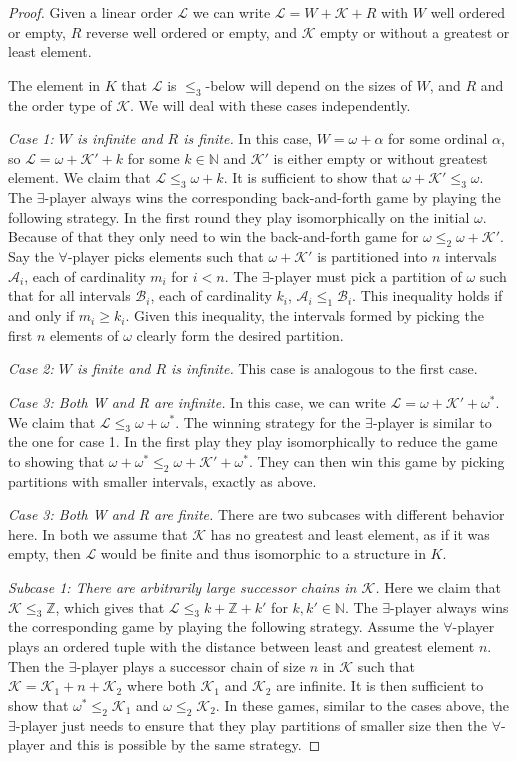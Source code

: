 \documentclass[10pt,a4paper]{amsart}
\providecommand{\A}{\mathcal{A}}
\providecommand{\L}{\mathcal{L}}
\providecommand{\B}{\mathcal{B}}
\newcommand{\Z}{\mathbb{Z}}
\newcommand{\K}{\mathcal{K}}
\renewcommand{\L}{\mathcal{L}}
\begin{document}
\begin{proof}
Given a linear order $\L$ we can write $\L=W+\K+R$ with $W$ well ordered or
empty, $R$ reverse well ordered or empty, and $\K$ empty or without a greatest or least element.

The element in $K$ that $\L$ is $\leq_3$-below will depend on the sizes
of $W$, and $R$ and the order type of $\K$. We will deal with these cases
independently.

\emph{Case 1: $W$ is infinite and $R$ is finite.}
In this case, $W=\omega+\alpha$ for some ordinal $\alpha$, so $\L=\omega+\K'+k$
for some $k\in \mathbb{N}$ and $\K'$ is either empty or without greatest element.
We claim that $\L\leq_3\omega+k$.
It is sufficient to show that $\omega+\K'\leq_3\omega$.
The $\exists$-player always wins the corresponding back-and-forth game by
playing the following strategy. In the first round they play isomorphically on
the initial $\omega$. Because of that they only need to win the back-and-forth game for $\omega\leq_2 \omega+\K'$. Say the $\forall$-player picks elements such that
$\omega+\K'$ is partitioned into $n$ intervals $\A_i$, each of cardinality $m_i$ for
$i<n$. The $\exists$-player must pick a partition of $\omega$ such that for all intervals $\B_i$, each of
cardinality $k_i$, $\A_i\leq_1 \B_i$. This inequality holds if and only if
$m_i\geq k_i$. Given this inequality, the intervals formed by picking the first $n$ elements of  $\omega$ 
clearly form the desired partition.

\emph{Case 2: $W$ is finite and $R$ is infinite.} This case is analogous to the
first case.

\emph{Case 3: Both W and R are infinite.}
In this case, we can write $\L=\omega+\K'+\omega^*$.
We claim that $\L\leq_3 \omega+\omega^*$. The winning strategy for the
$\exists$-player is similar to the one for case 1. In the first play they play
isomorphically to reduce the game to showing that $\omega+\omega^*\leq_2
\omega+\K'+\omega^*$. They can then win this game by picking partitions with
smaller intervals, exactly as above.

\emph{Case 3: Both W and R are finite.}
There are two subcases with different behavior here.
In both we assume that $\K$ has no greatest and least element, as if it was
empty, then $\L$ would be finite and thus isomorphic to a structure in $K$.

\emph{Subcase 1: There are arbitrarily large successor chains in $\K$.} Here we
claim that $\K\leq_3\Z$, which gives that $\L\leq_3 k+\Z+k'$ for $k,k'\in\mathbb{N}$.
The $\exists$-player always wins the corresponding game by playing the following
strategy. Assume the $\forall$-player plays an ordered tuple with the distance
between least and greatest element $n$. Then the $\exists$-player plays a
successor chain of size $n$ in $\K$ such that $\K=\K_1+n+\K_2$ where both $\K_1$
and $\K_2$ are infinite. It is then sufficient to show that $\omega^*\leq_2
\K_1$ and $\omega\leq_2 \K_2$. In these games, similar to the cases above, the
$\exists$-player just needs to ensure that they play partitions of smaller size
then the $\forall$-player and this is possible by the same strategy.


\end{proof}
\end{document}
